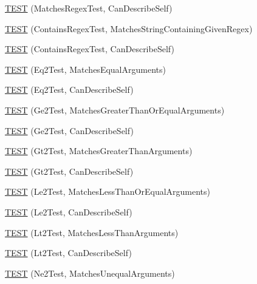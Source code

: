\begin{DoxyCompactItemize}
\item 
\mbox{\hyperlink{namespacetesting_1_1gmock__matchers__test_acb4e75ec699fe1bc178e7ec32fb479c8}{T\+E\+ST}} (Matches\+Regex\+Test, Can\+Describe\+Self)
\item 
\mbox{\hyperlink{namespacetesting_1_1gmock__matchers__test_a0a23f3ff8f97ccf74cd64673edc6694f}{T\+E\+ST}} (Contains\+Regex\+Test, Matches\+String\+Containing\+Given\+Regex)
\item 
\mbox{\hyperlink{namespacetesting_1_1gmock__matchers__test_ac3d469a146dec0c6ede2b46ff992c8d7}{T\+E\+ST}} (Contains\+Regex\+Test, Can\+Describe\+Self)
\item 
\mbox{\hyperlink{namespacetesting_1_1gmock__matchers__test_a768adf8450910e4c3ac0cb2caec8a4c2}{T\+E\+ST}} (Eq2\+Test, Matches\+Equal\+Arguments)
\item 
\mbox{\hyperlink{namespacetesting_1_1gmock__matchers__test_a45da3962b4ae052dd47e1ae1bfd8b762}{T\+E\+ST}} (Eq2\+Test, Can\+Describe\+Self)
\item 
\mbox{\hyperlink{namespacetesting_1_1gmock__matchers__test_a100bae52c11f2e44a141652002d3bee2}{T\+E\+ST}} (Ge2\+Test, Matches\+Greater\+Than\+Or\+Equal\+Arguments)
\item 
\mbox{\hyperlink{namespacetesting_1_1gmock__matchers__test_aaee5baf487e6234d1d8b6779b70a15c0}{T\+E\+ST}} (Ge2\+Test, Can\+Describe\+Self)
\item 
\mbox{\hyperlink{namespacetesting_1_1gmock__matchers__test_a4ef0cb0e88b7801075798649189d7b72}{T\+E\+ST}} (Gt2\+Test, Matches\+Greater\+Than\+Arguments)
\item 
\mbox{\hyperlink{namespacetesting_1_1gmock__matchers__test_ae7351eb01d03897324b2fe03045f2c10}{T\+E\+ST}} (Gt2\+Test, Can\+Describe\+Self)
\item 
\mbox{\hyperlink{namespacetesting_1_1gmock__matchers__test_add304ba60989990fc78a616c9592a948}{T\+E\+ST}} (Le2\+Test, Matches\+Less\+Than\+Or\+Equal\+Arguments)
\item 
\mbox{\hyperlink{namespacetesting_1_1gmock__matchers__test_a75d0bbfa66d404aa458f0739297c9edc}{T\+E\+ST}} (Le2\+Test, Can\+Describe\+Self)
\item 
\mbox{\hyperlink{namespacetesting_1_1gmock__matchers__test_ac7ecdd71d0cc49438f7ad1863fdfab05}{T\+E\+ST}} (Lt2\+Test, Matches\+Less\+Than\+Arguments)
\item 
\mbox{\hyperlink{namespacetesting_1_1gmock__matchers__test_a9f557c4688b2907704650cc18cfd9dcf}{T\+E\+ST}} (Lt2\+Test, Can\+Describe\+Self)
\item 
\mbox{\hyperlink{namespacetesting_1_1gmock__matchers__test_a69692057d2825f6fc8a37265667867c7}{T\+E\+ST}} (Ne2\+Test, Matches\+Unequal\+Arguments)

\end{DoxyCompactItemize}

